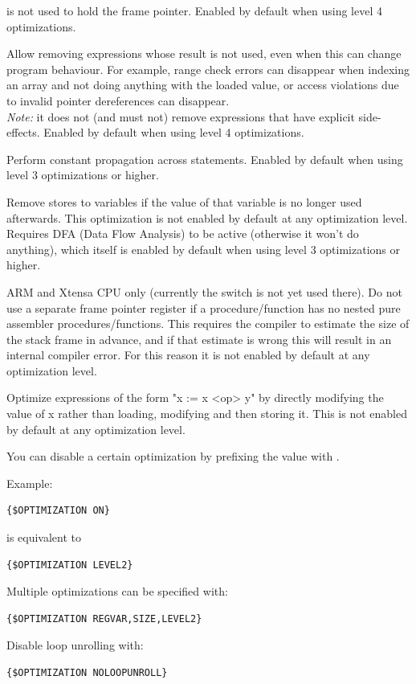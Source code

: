 \begin{description}
is not used to hold the frame pointer. Enabled by default when using
level 4 optimizations.
\item[DEADVALUES] Allow removing expressions whose result is not used, even when this can
change program behaviour. For example, range check errors can disappear when
indexing an array and not doing anything with the loaded value, or
access violations due to invalid pointer dereferences can disappear.\\
{\em Note:} it does not (and must not) remove expressions that have explicit
side-effects.  Enabled by default when using level 4 optimizations.
\item[CONSTPROP]  Perform constant propagation across statements. Enabled by default when using level
3 optimizations or higher.
\item[DEADSTORE] Remove stores to variables if the value of that variable is no longer
used afterwards. This optimization is not enabled by default at any optimization level.
Requires DFA (Data Flow Analysis) to be active (otherwise it won't do anything), which itself
is enabled by default when using level 3 optimizations or higher.
\item[FORCENOSTACKFRAME]  ARM and Xtensa CPU only (currently the switch is
not yet used there). Do not use a separate frame pointer register if a
procedure/function has no nested pure assembler procedures/functions.
This requires the compiler to estimate the size of the stack frame in
advance, and if that estimate is wrong this will result in an internal
compiler error. For this reason it is not enabled by default at any optimization level.
\item[USELOADMODIFYSTORE] Optimize expressions of the form "x := x <op> y" by directly modifying
the value of x rather than loading, modifying and then storing it. This is
not enabled by default at any optimization level.
\end{description}
You can disable a certain optimization by prefixing the value with .

Example:
\begin{verbatim}
{$OPTIMIZATION ON}
\end{verbatim}
is equivalent to 
\begin{verbatim}
{$OPTIMIZATION LEVEL2}
\end{verbatim}
Multiple optimizations can be specified with:
\begin{verbatim}
{$OPTIMIZATION REGVAR,SIZE,LEVEL2}
\end{verbatim}
Disable loop unrolling with:
\begin{verbatim}
{$OPTIMIZATION NOLOOPUNROLL}
\end{verbatim}

